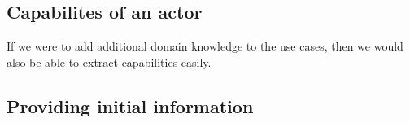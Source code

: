 \subsection{Capabilites of an actor}
If we were to add additional domain knowledge to the use cases, then we would also be able to extract capabilities easily.

\subsection{Providing initial information}


